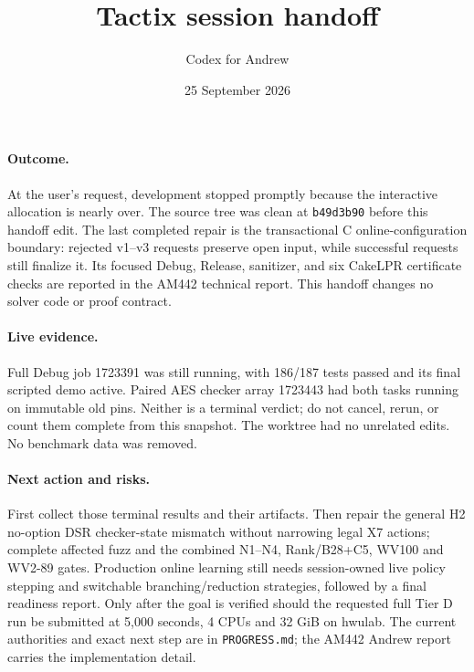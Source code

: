 \documentclass[11pt]{article}
\title{Tactix session handoff}
\author{Codex for Andrew}
\date{25 September 2026}
\begin{document}
\maketitle

\paragraph{Outcome.} At the user's request, development stopped promptly
because the interactive allocation is nearly over. The source tree was clean
at \texttt{b49d3b90} before this handoff edit. The last completed repair is
the transactional C online-configuration boundary: rejected v1--v3 requests
preserve open input, while successful requests still finalize it. Its focused
Debug, Release, sanitizer, and six CakeLPR certificate checks are reported in
the AM442 technical report. This handoff changes no solver code or proof
contract.

\paragraph{Live evidence.} Full Debug job 1723391 was still running, with
186/187 tests passed and its final scripted demo active. Paired AES checker
array 1723443 had both tasks running on immutable old pins. Neither is a
terminal verdict; do not cancel, rerun, or count them complete from this
snapshot. The worktree had no unrelated edits. No benchmark data was removed.

\paragraph{Next action and risks.} First collect those terminal results and
their artifacts. Then repair the general H2 no-option DSR checker-state
mismatch without narrowing legal X7 actions; complete affected fuzz and the
combined N1--N4, Rank/B28+C5, WV100 and WV2-89 gates. Production online
learning still needs session-owned live policy stepping and switchable
branching/reduction strategies, followed by a final readiness report. Only
after the goal is verified should the requested full Tier D run be submitted
at 5,000 seconds, 4 CPUs and 32 GiB on hwulab. The current authorities and
exact next step are in \texttt{PROGRESS.md}; the AM442 Andrew report carries
the implementation detail.
\end{document}
